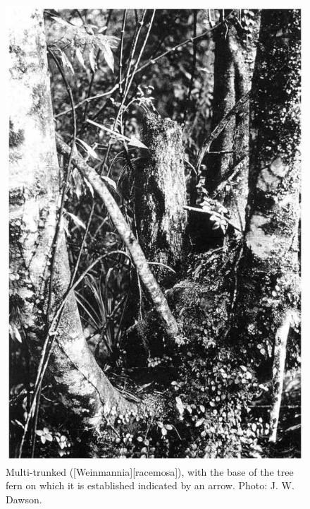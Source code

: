 \begin{figure}[htb]
\begin{minipage}[t]{0.475\textwidth}
    	\includegraphics[width=\textwidth]{graphics/figure56kamahi.jpg}
    	\caption[Multi-trunked kamahi]{Multi-trunked  ([Weinmannia][racemosa]), with the base of the tree fern on which it is established indicated by an arrow.
    	Photo: J. W. Dawson.}%
    	\label{fig:56kamahi}
	\end{minipage}
\end{figure}

